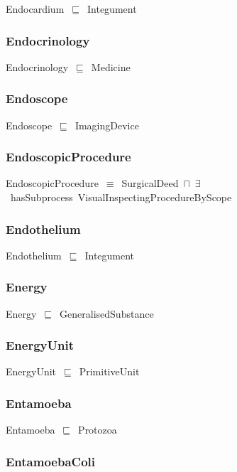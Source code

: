 \documentclass{article}
\begin{document}
Endocardium~\ensuremath{\sqsubseteq}~Integument~

\subsubsection*{Endocrinology}

Endocrinology~\ensuremath{\sqsubseteq}~Medicine~

\subsubsection*{Endoscope}

Endoscope~\ensuremath{\sqsubseteq}~ImagingDevice~

\subsubsection*{EndoscopicProcedure}

EndoscopicProcedure~\ensuremath{\equiv}~SurgicalDeed~\ensuremath{\sqcap}~\ensuremath{\exists}~hasSubprocess~VisualInspectingProcedureByScope

\subsubsection*{Endothelium}

Endothelium~\ensuremath{\sqsubseteq}~Integument~

\subsubsection*{Energy}

Energy~\ensuremath{\sqsubseteq}~GeneralisedSubstance~

\subsubsection*{EnergyUnit}

EnergyUnit~\ensuremath{\sqsubseteq}~PrimitiveUnit~

\subsubsection*{Entamoeba}

Entamoeba~\ensuremath{\sqsubseteq}~Protozoa~

\subsubsection*{EntamoebaColi}
\end{document}
